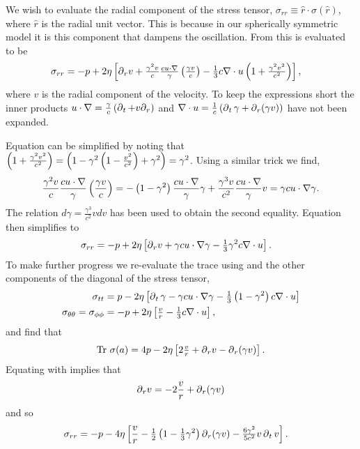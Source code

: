 We wish to evaluate the radial component of the stress tensor, $\sigma_{rr} \equiv \hat r \cdot \sigma(\hat r)$, where $\hat r$ is the radial unit vector.
This is because in our spherically symmetric model it is this component that dampens the oscillation.
From  this is evaluated to be 
\begin{align}
  \sigma_{rr}  &= -p + 2\eta \left[ {\operatorname{\partial}_r} v + \tfrac{\gamma^2 v}{c} \tfrac{c u\cdot \nabla }{\gamma}\left( \tfrac{\gamma v}{c} \right) - \tfrac{1}{3} c\nabla\cdot u\left( 1 + \tfrac{\gamma^2v^2}{c^2} \right) \right], \label{eqn:sigmarr1}
\end{align}
where $v$ is the radial component of the velocity.
To keep the expressions short  the inner products $ u\cdot \nabla = \frac{\gamma }{c} \left( \operatorname{\partial}_t + v {\operatorname{\partial}_r} \right)$ and $\nabla\cdot u = \frac{1}{c}\left( \operatorname{\partial}_t\gamma + {\operatorname{\partial}_r}(\gamma v) \right)$ have not been expanded.

Equation  can be simplified by noting that $\left( 1 + \tfrac{\gamma^2v^2}{c^2} \right) = \left( 1 - \gamma^2\left( 1-\tfrac{v^2}{c^2} \right) + \gamma^2  \right) =  \gamma^2$.
Using a similar trick we find,
\begin{align}
   \frac{\gamma^2 v}{c} \frac{c u\cdot \nabla }{\gamma}\left( \frac{\gamma v}{c} \right) 
=-\left( 1-\gamma^2  \right) \frac{c u\cdot \nabla }{\gamma}\gamma +\frac{\gamma^3 v}{c^2} \frac{c u\cdot \nabla }{\gamma}v
=\gamma c u\cdot \nabla \gamma. 
\end{align}
The relation $d \gamma = \frac{\gamma^3}{c^2} v d v$ has been used to obtain the second equality.
Equation  then simplifies to
\begin{align}
  \sigma_{rr}  &= -p + 2\eta \left[ {\operatorname{\partial}_r} v + \gamma c u\cdot \nabla\gamma - \tfrac{1}{3}\gamma^2 c\nabla\cdot u \right]. \label{eqn:sigmarr2}
\end{align}
To make further progress we re-evaluate the trace using  and the other components of the diagonal of the stress tensor,
\begin{align}
  \sigma_{tt} &= p - 2 \eta \left[ \operatorname{\partial}_t \gamma - \gamma c u \cdot \nabla \gamma - \tfrac{1}{3} \left( 1-\gamma^2 \right) c \nabla\cdot u     \right]\\
  \sigma_{\theta\theta} =  \sigma_{\phi\phi}  &= -p + 2\eta\left[ \tfrac{v}{r} - \tfrac{1}{3} c \nabla \cdot u \right],
\end{align}
and find that 
\begin{align}
  \textrm{Tr}\ \sigma(a) = 4p - 2 \eta \left[ 2 \tfrac{v}{r} + {\operatorname{\partial}_r} v - {\operatorname{\partial}_r}(\gamma v)  \right].\label{eqn:RelStressTrace2}
\end{align}
Equating  with  implies that
\begin{align}
  {\operatorname{\partial}_r} v = - 2 \frac{v}{r}  + {\operatorname{\partial}_r}(\gamma v)
\end{align}
and so
\begin{align}
  \sigma_{rr}  &= -p - 4\eta \left[   \frac{v}{r}  -\tfrac{1}{2}\left( 1-\tfrac{1}{3}\gamma^2 \right){\operatorname{\partial}_r}(\gamma v) - \tfrac{6\gamma^2}{5c^2} v \operatorname{\partial}_t v   \right]. \label{eqn:sigmarr3}
\end{align}

